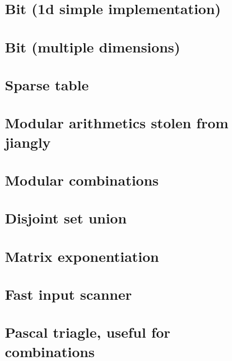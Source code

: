 \section{Bit (1d simple implementation)}
\raggedbottom

\section{Bit (multiple dimensions)}
\raggedbottom

\section{Sparse table}
\raggedbottom

\section{Modular arithmetics stolen from jiangly}
\raggedbottom

\section{Modular combinations}
\raggedbottom

\section{Disjoint set union}
\raggedbottom

\section{Matrix exponentiation}
\raggedbottom

\section{Fast input scanner}
\raggedbottom

\section{Pascal triagle, useful for combinations}
\raggedbottom

